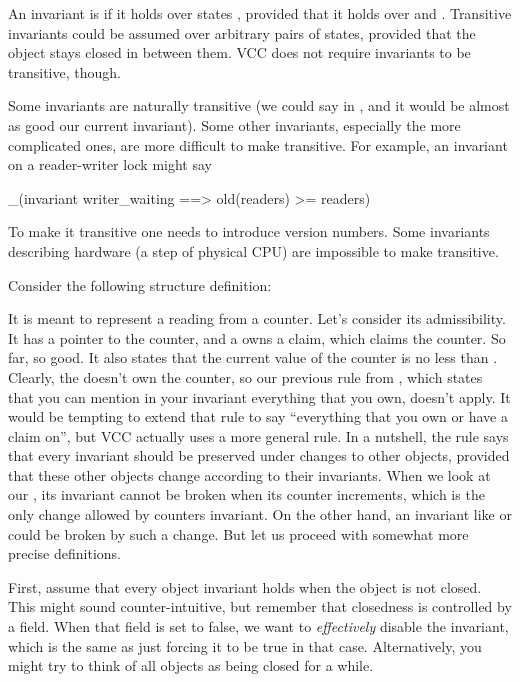 \begin{note}
An invariant is  if it holds over states ,
provided that it holds over  and .
Transitive invariants could be assumed over arbitrary
pairs of states, provided that the object stays closed
in between them. 
VCC does not require invariants to be transitive, though.

Some invariants are naturally transitive (\eg we could say
 in ,
and it would be almost as good our current invariant).
Some other invariants, especially the more complicated ones,
are more difficult to make transitive.
For example, an invariant on a reader-writer lock might say
\begin{VCC}
_(invariant writer_waiting ==> old(readers) >= readers)
\end{VCC}
\noindent
To make it transitive one needs to introduce version numbers.
Some invariants describing hardware (\eg a step of physical CPU)
are impossible to make transitive.
\end{note}

Consider the following structure definition:


\noindent 
It is meant to represent a reading from a counter.
Let's consider its admissibility.
It has a pointer to the counter, and a owns a claim, which
claims the counter.
So far, so good.
It also states that the current value of the counter is no less than .
Clearly, the  doesn't own the counter, so our previous rule
from , which states
that you can mention in your invariant everything that you own, doesn't apply.
It would be tempting to extend that rule to say ``everything that you own
or have a claim on'', but VCC actually uses a more general rule.
In a nutshell, the rule says that every invariant should be preserved
under changes to other objects, provided that these other objects change
according to their invariants.
When we look at our , its invariant cannot be broken when
its counter increments, which is the only change allowed by counters invariant.
On the other hand, an invariant like  or 
could be broken by such a change.
But let us proceed with somewhat more precise definitions.

First, assume that every object invariant holds when the object is not closed.
This might sound counter-intuitive, but remember that closedness is controlled
by a field.
When that field is set to false, we want to \emph{effectively} disable the invariant,
which is the same as just forcing it to be true in that case.
Alternatively, you might try to think of all objects as being closed for a while.

